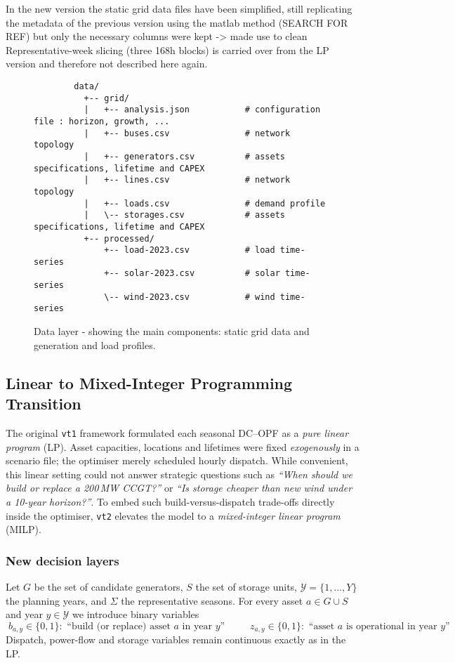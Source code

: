 In the new version the static grid data files have been simplified, still replicating the
metadata of the previous version using the matlab method (SEARCH FOR REF) but only the necessary 
columns were kept -> made use to clean 
Representative-week slicing (three 168h blocks) is carried over from the LP version and therefore not
described here again.

\begin{figure}[h!]
  \centering
    \begin{verbatim}
        data/         
          +-- grid/                       
          |   +-- analysis.json           # configuration file : horizon, growth, ...
          |   +-- buses.csv               # network topology
          |   +-- generators.csv          # assets specifications, lifetime and CAPEX
          |   +-- lines.csv               # network topology
          |   +-- loads.csv               # demand profile
          |   \-- storages.csv            # assets specifications, lifetime and CAPEX
          +-- processed/                  
              +-- load-2023.csv           # load time-series
              +-- solar-2023.csv          # solar time-series
              \-- wind-2023.csv           # wind time-series
    \end{verbatim}
  \caption{Data layer - showing the main components: static grid data and generation and load profiles.}
  \label{fig:data-layer}
\end{figure}

\subsection{Linear to Mixed-Integer Programming Transition}
\label{subsec:lin_to_milp}

The original \texttt{vt1} framework formulated each seasonal DC--OPF as a \emph{pure linear program} (LP).  
Asset capacities, locations and lifetimes were fixed \emph{exogenously} in a scenario file; the optimiser merely 
scheduled hourly dispatch.  
While convenient, this linear setting could not answer strategic questions such as
\emph{“When should we build or replace a 200\,MW CCGT?”} or
\emph{“Is storage cheaper than new wind under a 10-year horizon?”}.  
To embed such build-versus-dispatch trade-offs directly inside the optimiser, \texttt{vt2} elevates the model to a
\emph{mixed-integer linear program} (MILP).

\subsubsection{New decision layers}
Let $G$ be the set of candidate generators, $S$ the set of storage units,  
$\mathcal{Y}=\{1,\dots,Y\}$ the planning years, and $\Sigma$ the representative seasons.
For every asset $a\!\in\!G\cup S$ and year $y\!\in\!\mathcal{Y}$ we introduce binary variables
\[
\boxed{\;b_{a,y}\in\{0,1\}: \text{ ``build (or replace) asset $a$ in year $y$''}\;}
\qquad
\boxed{\;z_{a,y}\in\{0,1\}: \text{ ``asset $a$ is operational in year $y$''}\;}
\]
Dispatch, power-flow and storage variables remain continuous exactly as in the LP.


